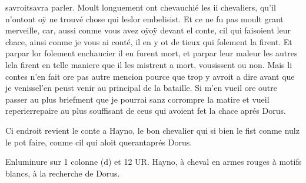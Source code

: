 \documentclass{article}
\begin{document}
\begin{pages}
      savroitsavra parler. \pend
\pstart Moult longuement ont chevauchié les ii 
   chevaliers, qu’il n’ontont oÿ ne trouvé chose qui 
   leslor embelisist. Et ce ne fu pas 
   moult grant merveille, car, aussi conme vous avez oÿoÿ devant 
      el conte, cil qui faisoient leur chace, ainsi conme je 
         vous ai conté, il en y ot de tieux qui folement 
   la firent. Et parpar lor 
      folement enchaucier il en furent mort, et 
   parpar leur maleur les autres 
   lela firent en telle maniere que il les mistrent a mort, 
   vousissent ou non. Mais li contes n’en fait ore pas autre mencion pource que trop y avroit a dire 
   avant que je venissel'en peust venir 
      au principal de la bataille. 
         Si m’en vueil ore outre passer au plus briefment que je pourrai sanz corrompre la matire 
   et vueil reperierrepaire au plus souffisant de ceus qui avoient fet la chace aprés Dorus. \pend
         
         
            Ci endroit revient le conte a 
               Hayno, le bon chevalier qui si bien le fist conme nulz le pot faire, 
               conme cil qui aloit querantaprés 
               Dorus.            
            
            
               Enluminure sur 1 colonne (d) et 12 UR.
                  Hayno, à cheval en armes rouges à motifs blancs, 
                  à la recherche de Dorus.
               

\end{pages}
\end{document}
